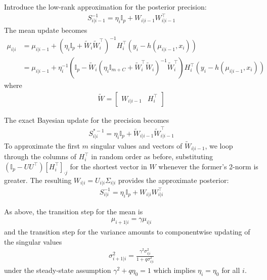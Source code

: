 Introduce the low-rank approximation for the posterior precision:
\begin{align}
S_{i\vert i-1}^{-1}=\eta_{i}\mathbb{I}_{p}+W_{i\vert i-1}W_{i\vert i-1}^{\top}
\end{align}
The mean update becomes 
\begin{align}
\mu_{i\vert i} & =\mu_{i\vert i-1}+\left(\eta_{i}\mathbb{I}_{p}+\tilde{W}_{i}\tilde{W}_{i}^{\top}\right)^{-1}H_{i}^{\top}\left(y_{i}-h(\mu_{i\vert i-1},x_i)\right) \label{eq:adaptive-ORFit-mean-update}\\
 & =\mu_{i\vert i-1}+\eta_{i}^{-1}\left(\mathbb{I}_{p}-\tilde{W}_{i}\left(\eta_{i}\mathbb{I}_{m+C}+\tilde{W}_{i}^{\top}\tilde{W}_{i}\right)^{-1}\tilde{W}_{i}^{\top}\right)H_{i}^{\top}\left(y_{i}-h(\mu_{i\vert i-1},x_i)\right)
\end{align}
where 
\begin{align}
\tilde{W}=\left[\begin{array}{cc}
W_{i\vert i-1} & H_{i}^{\top}\end{array}\right]
\end{align}

The exact Bayesian update for the precision becomes
\begin{align}
S_{i\vert i}^{*-1}=\eta_{i}\mathbb{I}_{p}+\tilde{W}_{i\vert i-1}\tilde{W}_{i\vert i-1}^{\top}
\end{align}
To approximate the first $m$ singular values and vectors of $\tilde{W}_{i\vert i-1}$,
we loop through the columns of $H_{i}^{\top}$ in random order as before, substituting
$\left(\mathbb{I}_{p}-UU^{\top}\right)\left[H_{i}^{\top}\right]_{\cdot j}$
for the shortest vector in $W$ whenever the former's 2-norm is greater.
The resulting $W_{i\vert i}=U_{i\vert i}\Sigma_{i\vert i}$ provides
the approximate posterior:
\begin{align}
S_{i\vert i}^{-1}=\eta_{i}\mathbb{I}_{p}+W_{i\vert i}W_{i\vert i}^{\top}
\end{align}

As above, the transition step for the mean is 
\begin{align}
\mu_{i+1\vert i}=\gamma\mu_{i\vert i}
\end{align}
and the transition step for the variance amounts to componentwise
updating of the singular values
\begin{align}
\sigma_{i+1\vert i}^{2}=\frac{\gamma^{2}\sigma_{i\vert i}^{2}}{1+q\sigma_{i\vert i}^{2}}
\end{align}
under the steady-state assumption $\gamma^{2}+q\eta_{0}=1$ which
implies $\eta_{i}=\eta_{0}$ for all $i$.

